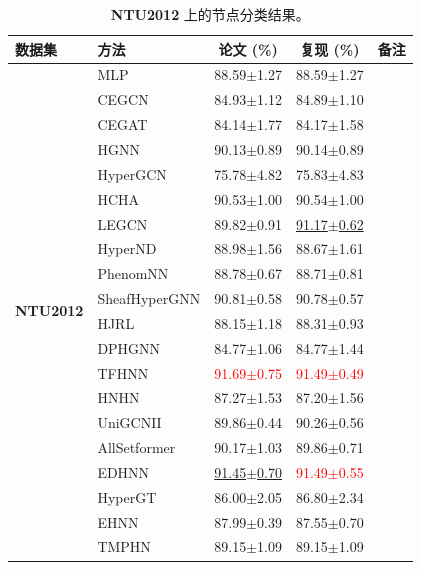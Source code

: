 \documentclass[11pt,a4paper]{article}
\begin{document}
\begin{table}[H]
	\centering\small
	\begin{tabular}{llccc}
		\toprule
		数据集 & 方法 & 论文 (\%) & 复现 (\%) & 备注 \\
		\midrule
		\multirow{20}{*}{\textbf{NTU2012}} & MLP               & 88.59$\pm$1.27   & 88.59$\pm$1.27   &  \\
		 & CEGCN             & 84.93$\pm$1.12   & 84.89$\pm$1.10   &  \\
		 & CEGAT             & 84.14$\pm$1.77   & 84.17$\pm$1.58   &  \\
		 & HGNN              & 90.13$\pm$0.89   & 90.14$\pm$0.89   &  \\
		 & HyperGCN          & 75.78$\pm$4.82   & 75.83$\pm$4.83   &  \\
		 & HCHA              & 90.53$\pm$1.00   & 90.54$\pm$1.00   &  \\
		 & LEGCN             & 89.82$\pm$0.91   & \underline{91.17$\pm$0.62}   &  \\
		 & HyperND           & 88.98$\pm$1.56   & 88.67$\pm$1.61   &  \\
		 & PhenomNN          & 88.78$\pm$0.67   & 88.71$\pm$0.81   &  \\
		 & SheafHyperGNN     & 90.81$\pm$0.58   & 90.78$\pm$0.57   &  \\
		 & HJRL              & 88.15$\pm$1.18   & 88.31$\pm$0.93   &  \\
		 & DPHGNN            & 84.77$\pm$1.06   & 84.77$\pm$1.44   &  \\
		 & TFHNN             & \textcolor{red}{91.69$\pm$0.75}   & \textcolor{red}{91.49$\pm$0.49}   &  \\
		 & HNHN              & 87.27$\pm$1.53   & 87.20$\pm$1.56   &  \\
		 & UniGCNII          & 89.86$\pm$0.44   & 90.26$\pm$0.56   &  \\
		 & AllSetformer      & 90.17$\pm$1.03   & 89.86$\pm$0.71   &  \\
		 & EDHNN             & \underline{91.45$\pm$0.70}   & \textcolor{red}{91.49$\pm$0.55}   &  \\
		 & HyperGT           & 86.00$\pm$2.05   & 86.80$\pm$2.34   &  \\
		 & EHNN              & 87.99$\pm$0.39   & 87.55$\pm$0.70   &  \\
		 & TMPHN             & 89.15$\pm$1.09   & 89.15$\pm$1.09   &  \\
		\bottomrule
	\end{tabular}
	\caption{\textbf{NTU2012} 上的节点分类结果。}
\end{table}
\end{document}
